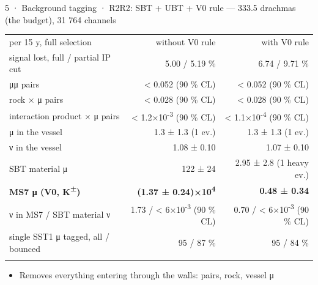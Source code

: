 \begin{btframe}{5 · Background tagging · R2}{R2: SBT + UBT + V0 rule — 333.5 drachmas (the budget), 31 764 channels}
{\centering {}\par}
\vspace{2.46pt}
\noindent \begin{minipage}[c]{0.5\linewidth}
{\fontsize{5.31pt}{6.90pt}\selectfont\setlength{\tabcolsep}{3.72pt}\renewcommand{\arraystretch}{1.42}
\begin{tabular}{lrr}
\textcolor{muted}{per 15 y, full selection} & \textcolor{muted}{without V0 rule} & \textcolor{muted}{with V0 rule} \\\headrule
signal lost, full / partial IP cut & 5.00 / 5.19 \% & 6.74 / 9.71 \% \\\rowrule
μμ pairs & < 0.052 (90 \% CL) & < 0.052 (90 \% CL) \\\rowrule
rock × μ pairs & < 0.028 (90 \% CL) & < 0.028 (90 \% CL) \\\rowrule
interaction product × μ pairs & < 1.2×10\textsuperscript{-3} (90 \% CL) & < 1.1×10\textsuperscript{-4} (90 \% CL) \\\rowrule
μ in the vessel & 1.3 ± 1.3 (1 ev.) & 1.3 ± 1.3 (1 ev.) \\\rowrule
ν in the vessel & 1.08 ± 0.10 & 1.07 ± 0.10 \\\rowrule
SBT material μ & 122 ± 24 & 2.95 ± 2.8 (1 heavy ev.) \\\rowrule
\rowcolor{tint}\bfseries MS7 μ (V0, K\textsuperscript{±}) & \bfseries (1.37 ± 0.24)×10\textsuperscript{4} & \bfseries 0.48 ± 0.34 \\\rowrule
ν in MS7 / SBT material ν & 1.73 / < 6×10\textsuperscript{-3} (90 \% CL) & 0.70 / < 6×10\textsuperscript{-3} (90 \% CL) \\\rowrule
single SST1 μ tagged, all / bounced & 95 / 87 \% & 95 / 84 \% \\\rowrule
\end{tabular}\par}
\end{minipage}%
\hfill%
\begin{minipage}[c]{0.5\linewidth}
{\fontsize{6.15pt}{8.60pt}\selectfont
\begin{itemize}
  \item Removes everything entering through the walls: pairs, rock, vessel μ

\end{itemize}}
\end{minipage}
\end{btframe}
